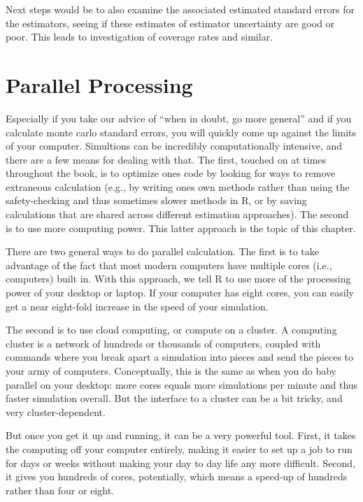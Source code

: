 \documentclass[
]{book}
\begin{document}
Next steps would be to also examine the associated estimated standard errors
for the estimators, seeing if these estimates of estimator uncertainty are
good or poor. This leads to investigation of coverage rates and similar.

\hypertarget{parallel-processing}{%
\chapter{Parallel Processing}\label{parallel-processing}}

Especially if you take our advice of ``when in doubt, go more general'' and if you calculate monte carlo standard errors, you will quickly come up against the limits of your computer.
Simultions can be incredibly computationally intensive, and there are a few means for dealing with that.
The first, touched on at times throughout the book, is to optimize ones code by looking for ways to remove extraneous calculation (e.g., by writing ones own methods rather than using the safety-checking and thus sometimes slower methods in R, or by saving calculations that are shared across different estimation approaches).
The second is to use more computing power.
This latter approach is the topic of this chapter.

There are two general ways to do parallel calculation.
The first is to take advantage of the fact that most modern computers have multiple cores (i.e., computers) built in.
With this approach, we tell R to use more of the processing power of your desktop or laptop.
If your computer has eight cores, you can easily get a near eight-fold increase in the speed of your simulation.

The second is to use cloud computing, or compute on a cluster.
A computing cluster is a network of hundreds or thousands of computers, coupled with commands where you break apart a simulation into pieces and send the pieces to your army of computers.
Conceptually, this is the same as when you do baby parallel on your desktop: more cores equals more simulations per minute and thus faster simulation overall.
But the interface to a cluster can be a bit tricky, and very cluster-dependent.

But once you get it up and running, it can be a very powerful tool.
First, it takes the computing off your computer entirely, making it easier to set up a job to run for days or weeks without making your day to day life any more difficult.
Second, it gives you hundreds of cores, potentially, which means a speed-up of hundreds rather than four or eight.
\end{document}
